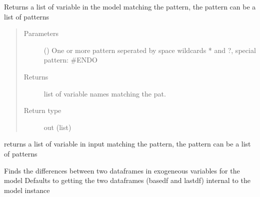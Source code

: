 \documentclass[letterpaper,10pt,english]{sphinxmanual}
\begin{document}
\begin{fulllineitems}
\begin{fulllineitems}
\label{\detokenize{index:modelclass.Org_model_Mixin.vlist}}
\pysigstartsignatures
{}
\pysigstopsignatures
\sphinxAtStartPar
Returns a list of variable in the model matching the pattern, the pattern can be a list of patterns
\begin{quote}\begin{description}
\item[{Parameters}] \leavevmode
\sphinxAtStartPar
{} () \textendash{} One or more pattern seperated by space wildcards * and ?, special pattern: \#ENDO

\item[{Returns}] \leavevmode
\sphinxAtStartPar
list of variable names matching the pat.

\item[{Return type}] \leavevmode
\sphinxAtStartPar
out (list)

\end{description}\end{quote}

\end{fulllineitems}


\begin{fulllineitems}
\label{\detokenize{index:modelclass.Org_model_Mixin.list_names}}
\pysigstartsignatures
{}
\pysigstopsignatures
\sphinxAtStartPar
returns a list of variable in input  matching the pattern, the pattern can be a list of patterns

\end{fulllineitems}


\begin{fulllineitems}
\label{\detokenize{index:modelclass.Org_model_Mixin.exodif}}
\pysigstartsignatures
{}
\pysigstopsignatures
\sphinxAtStartPar
Finds the differences between two dataframes in exogeneous variables for the model
Defaults to getting the two dataframes (basedf and lastdf) internal to the model instance


\end{fulllineitems}
\end{fulllineitems}
\end{document}
